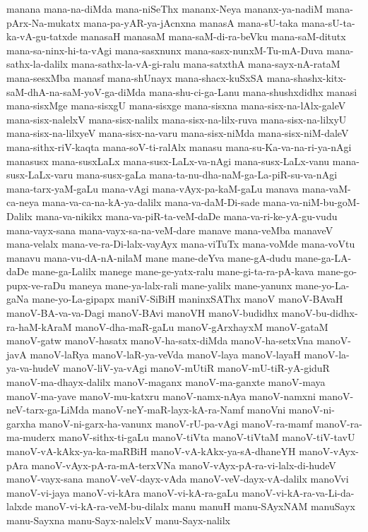 {manana
mana-na-diMda
mana-niSeThx
mananx-Neya
mananx-ya-nadiM
mana-pArx-Na-mukatx
mana-pa-yAR-ya-jAcnxna
manasA
mana-sU-taka
mana-sU-ta-ka-vA-gu-tatxde
manasaH
manasaM
mana-saM-di-ra-beVku
mana-saM-ditutx
mana-sa-ninx-hi-ta-vAgi
mana-sasxnunx
mana-sasx-nunxM-Tu-mA-Duva
mana-sathx-la-dalilx
mana-sathx-la-vA-gi-ralu
mana-satxthA
mana-sayx-nA-rataM
mana-sesxMba
manasf
mana-shUnayx
mana-shacx-kuSxSA
mana-shashx-kitx-saM-dhA-na-saM-yoV-ga-diMda
mana-shu-ci-ga-Lanu
mana-shushxdidhx
manasi
mana-sisxMge
mana-sisxgU
mana-sisxge
mana-sisxna
mana-sisx-na-lAlx-galeV
mana-sisx-nalelxV
mana-sisx-nalilx
mana-sisx-na-lilx-ruva
mana-sisx-na-lilxyU
mana-sisx-na-lilxyeV
mana-sisx-na-varu
mana-sisx-niMda
mana-sisx-niM-daleV
mana-sithx-riV-kaqta
mana-soV-ti-ralAlx
manasu
mana-su-Ka-va-na-ri-ya-nAgi
manasusx
mana-susxLaLx
mana-susx-LaLx-va-nAgi
mana-susx-LaLx-vanu
mana-susx-LaLx-varu
mana-susx-gaLa
mana-ta-nu-dha-naM-ga-La-piR-su-va-nAgi
mana-tarx-yaM-gaLu
mana-vAgi
mana-vAyx-pa-kaM-gaLu
manava
mana-vaM-ca-neya
mana-va-ca-na-kA-ya-dalilx
mana-va-daM-Di-sade
mana-va-niM-bu-goM-Dalilx
mana-va-nikikx
mana-va-piR-ta-veM-daDe
mana-va-ri-ke-yA-gu-vudu
mana-vayx-sana
mana-vayx-sa-na-veM-dare
manave
mana-veMba
manaveV
mana-velalx
mana-ve-ra-Di-lalx-vayAyx
mana-viTuTx
mana-voMde
mana-voVtu
manavu
mana-vu-dA-nA-nilaM
mane
mane-deYva
mane-gA-dudu
mane-ga-LA-daDe
mane-ga-Lalilx
manege
mane-ge-yatx-ralu
mane-gi-ta-ra-pA-kava
mane-go-pupx-ve-raDu
maneya
mane-ya-lalx-rali
mane-yalilx
mane-yanunx
mane-yo-La-gaNa
mane-yo-La-gipapx
maniV-SiBiH
maninxSAThx
manoV
manoV-BAvaH
manoV-BA-va-va-Dagi
manoV-BAvi
manoVH
manoV-budidhx
manoV-bu-didhx-ra-haM-kAraM
manoV-dha-maR-gaLu
manoV-gArxhayxM
manoV-gataM
manoV-gatw
manoV-hasatx
manoV-ha-satx-diMda
manoV-ha-setxVna
manoV-javA
manoV-laRya
manoV-laR-ya-veVda
manoV-laya
manoV-layaH
manoV-la-ya-va-hudeV
manoV-liV-ya-vAgi
manoV-mUtiR
manoV-mU-tiR-yA-giduR
manoV-ma-dhayx-dalilx
manoV-maganx
manoV-ma-ganxte
manoV-maya
manoV-ma-yave
manoV-mu-katxru
manoV-namx-nAya
manoV-namxni
manoV-neV-tarx-ga-LiMda
manoV-neY-maR-layx-kA-ra-Namf
manoVni
manoV-ni-garxha
manoV-ni-garx-ha-vanunx
manoV-rU-pa-vAgi
manoV-ra-mamf
manoV-ra-ma-muderx
manoV-sithx-ti-gaLu
manoV-tiVta
manoV-tiVtaM
manoV-tiV-tavU
manoV-vA-kAkx-ya-ka-maRBiH
manoV-vA-kAkx-ya-sA-dhaneYH
manoV-vAyx-pAra
manoV-vAyx-pA-ra-mA-terxVNa
manoV-vAyx-pA-ra-vi-lalx-di-hudeV
manoV-vayx-sana
manoV-veV-dayx-vAda
manoV-veV-dayx-vA-dalilx
manoVvi
manoV-vi-jaya
manoV-vi-kAra
manoV-vi-kA-ra-gaLu
manoV-vi-kA-ra-va-Li-da-lalxde
manoV-vi-kA-ra-veM-bu-dilalx
manu
manuH
manu-SAyxNAM
manuSayx
manu-Sayxna
manu-Sayx-nalelxV
manu-Sayx-nalilx
}
